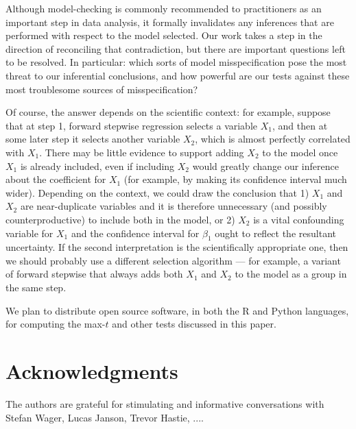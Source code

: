 \documentclass{article}
\begin{document}
Although model-checking is commonly recommended to practitioners as an important step in data analysis, it formally invalidates any inferences that are performed with respect to the model selected. Our work takes a step in the direction of reconciling that contradiction, but there are important questions left to be resolved. In particular: which sorts of model misspecification pose the most threat to our inferential conclusions, and how powerful are our tests against these most troublesome sources of misspecification? 

Of course, the answer depends on the scientific context: for example, suppose that at step 1, forward stepwise regression selects a variable $X_1$, and then at some later step it selects another variable $X_2$, which is almost perfectly correlated with $X_1$. There may be little evidence to support adding $X_2$ to the model once $X_1$ is already included, even if including $X_2$ would greatly change our inference about the coefficient for $X_1$ (for example, by making its confidence interval much wider). Depending on the context, we could draw the conclusion that 1) $X_1$ and $X_2$ are near-duplicate variables and it is therefore unnecessary (and possibly counterproductive) to include both in the model, or 2) $X_2$ is a vital confounding variable for $X_1$ and the confidence interval for $\beta_1$ ought to reflect the resultant uncertainty. If the second interpretation is the scientifically appropriate one, then we should probably use a different selection algorithm --- for example, a variant of forward stepwise that always adds both $X_1$ and $X_2$ to the model as a group in the same step.

We plan to distribute  open source software, in both the R and Python languages,  for computing the max-$t$ and other tests discussed in this paper.



\section*{Acknowledgments}

The authors are grateful for stimulating and informative conversations with Stefan Wager, Lucas Janson, Trevor Hastie, ....



\end{document}

